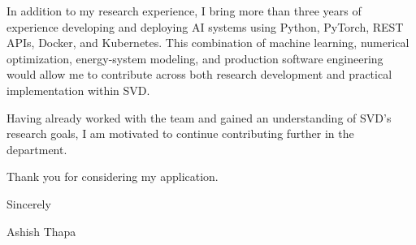 \documentclass[11pt,a4paper]{article}
\begin{document}
\vspace{10pt}
In addition to my research experience, I bring more than three years of
experience developing and deploying AI systems using Python, PyTorch, REST
APIs, Docker, and Kubernetes. This combination of machine learning, numerical
optimization, energy-system modeling, and production software engineering
would allow me to contribute across both research development and practical
implementation within SVD.

\vspace{10pt}
Having already worked with the team and gained an understanding of SVD's
research goals, I am motivated to continue contributing further in the department.

\vspace{10pt}
Thank you for considering my application.

\vspace{10pt}
Sincerely

\vspace{8pt}
Ashish Thapa
\end{document}
